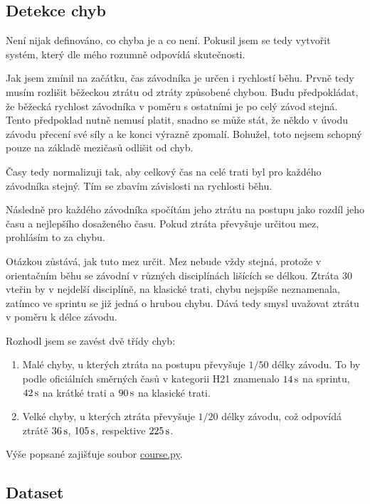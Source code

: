 \documentclass[a4paper,11pt]{article}
\begin{document}
\subsection*{Detekce chyb}

Není nijak definováno, co chyba je a co není. Pokusil jsem se tedy vytvořit
systém, který dle mého rozumně odpovídá skutečnosti.

Jak jsem zmínil na začátku, čas závodníka je určen i rychlostí běhu. Prvně tedy
musím rozlišit běžeckou ztrátu od ztráty způsobené chybou. Budu předpokládat, že
běžecká rychlost závodníka v poměru s ostatními je po celý závod stejná.
Tento předpoklad nutně nemusí platit, snadno se může stát, že někdo v úvodu
závodu přecení své síly a ke konci výrazně zpomalí. Bohužel, toto nejsem schopný
pouze na základě mezičasů odlišit od chyb.

Časy tedy normalizuji tak, aby celkový čas na celé trati byl pro každého
závodníka stejný. Tím se zbavím závislosti na rychlosti běhu.

Následně pro každého závodníka spočítám jeho ztrátu na postupu jako rozdíl jeho
času a nejlepšího dosaženého času. Pokud ztráta převyšuje určitou mez, prohlásím
to za chybu.

Otázkou zůstává, jak tuto mez určit. Mez nebude vždy stejná, protože v
orientačním běhu se závodní v různých disciplínách lišících se délkou. Ztráta 30
vteřin by v nejdelší disciplíně, na klasické trati, chybu nejspíše neznamenala,
zatímco ve sprintu se již jedná o hrubou chybu. Dává tedy smysl uvažovat ztrátu
v poměru k délce závodu.

Rozhodl jsem se zavést dvě třídy chyb:
\begin{enumerate}
    \item Malé chyby, u kterých ztráta na postupu převyšuje $1/50$ délky závodu.
    To by podle oficiálních směrných časů v kategorii H21 znamenalo $14\,\rm s$
    na sprintu, $42\,\rm s$ na krátké trati a $90\,\rm s$ na klasické trati.
    \item Velké chyby, u kterých ztráta převyšuje $1/20$ délky závodu, což
    odpovídá ztrátě $36\,\rm s$, $105\,\rm s$, respektive $225\,\rm s$.
\end{enumerate}

Výše popsané zajišťuje soubor
\href{https://github.com/kulisak12/mistake-stats/blob/main/course.py}{course.py}.

\subsection*{Dataset}
\end{document}
